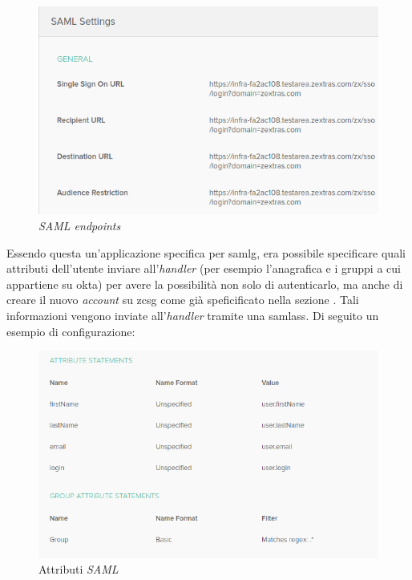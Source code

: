     \begin{figure}[h]
        \centering
        \includegraphics[width=1\textwidth]{immagini/endpoints.png}
        \caption{\textit{SAML endpoints}}
        \label{fig: SAML endpoints}
    \end{figure}
Essendo questa un'applicazione specifica per \gls{samlg}, era possibile specificare quali attributi dell'utente inviare all'\textit{handler} (per esempio l'anagrafica e i gruppi a cui appartiene su \gls{okta}) per avere la possibilità non solo di autenticarlo, ma anche di creare il nuovo \textit{account} su \gls{zcsg} come già speficificato nella sezione . Tali informazioni vengono inviate all'\textit{handler} tramite una \gls{samlass}. Di seguito un esempio di configurazione:
\newpage
    \begin{figure}[h]
        \centering
        \includegraphics[width=1\textwidth]{immagini/saml_attributes.png}
        \caption{Attributi \textit{SAML}}
        \label{fig: Attributi SAML}
    \end{figure}

